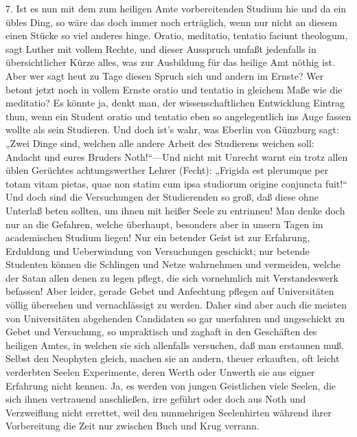 7. Ist es nun mit dem zum heiligen Amte vorbereitenden Studium hie und da ein übles Ding, so wäre das doch immer noch erträglich, wenn nur nicht an diesem einen Stücke so viel anderes hinge. Oratio, meditatio, tentatio faciunt theologum, sagt Luther mit vollem Rechte, und dieser Ausspruch umfaßt jedenfalls in übersichtlicher Kürze alles, was zur Ausbildung für das heilige Amt nöthig ist. Aber wer sagt heut zu Tage diesen Spruch sich und andern im Ernste? Wer betont jetzt noch
in vollem Ernste oratio und tentatio in gleichem Maße wie die meditatio? Es könnte ja, denkt man, der wissenschaftlichen Entwicklung Eintrag thun, wenn ein Student oratio und tentatio eben so angelegentlich ins Auge fassen wollte als sein Studieren. Und doch ist’s wahr, was Eberlin von Günzburg sagt: „Zwei Dinge sind, welchen alle andere Arbeit des Studierens weichen soll: Andacht und eures Bruders Noth!“—Und nicht mit Unrecht warnt ein trotz allen üblen Gerüchtes achtungswerther Lehrer (Fecht): „Frigida est plerumque per totam vitam pietas, quae non statim cum ipsa studiorum origine conjuncta fuit!“ Und doch sind die Versuchungen der Studierenden so groß, daß diese ohne Unterlaß beten sollten, um ihnen mit heißer Seele zu entrinnen! Man denke doch nur an die Gefahren, welche überhaupt, besonders aber in unsern Tagen im academischen Studium liegen! Nur ein betender Geist ist zur Erfahrung, Erduldung und Ueberwindung von Versuchungen geschickt; nur betende Studenten können die Schlingen und Netze wahrnehmen und vermeiden, welche der Satan allen denen zu legen pflegt, die sich vornehmlich mit Verstandeswerk befassen! Aber leider, gerade Gebet und Anfechtung pflegen auf Universitäten völlig übersehen und vernachlässigt zu werden. Daher sind aber auch die meisten von Universitäten abgehenden Candidaten so gar unerfahren und ungeschickt zu Gebet und Versuchung, so unpraktisch und zaghaft in den Geschäften des heiligen Amtes, in welchen sie sich allenfalls versuchen, daß man erstaunen muß. Selbst den Neophyten gleich, machen sie an andern, theuer erkauften, oft
leicht verderbten Seelen Experimente, deren Werth oder Unwerth sie aus eigner Erfahrung nicht kennen. Ja, es werden von jungen Geistlichen viele Seelen, die sich ihnen vertrauend anschließen, irre geführt oder doch aus Noth und Verzweiflung nicht errettet, weil den nunmehrigen Seelenhirten während ihrer Vorbereitung die Zeit nur zwischen Buch und Krug verrann.

